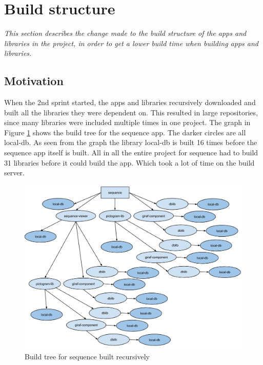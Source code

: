 \section{Build structure}
\label{Sprint2_buildstructure}
\textit{This section describes the change made to the build structure of the apps and libraries in the project, in order to get a lower build time when building apps and libraries.}

\subsection{Motivation}

When the 2nd sprint started, the apps and libraries recursively downloaded and built all the libraries they were dependent on. This resulted in large repositories, since many libraries were included multiple times in one project. The graph in Figure \ref{oldbuild} shows the build tree for the sequence app. The darker circles are all local-db. As seen from the graph the library local-db is built 16 times before the sequence app itself is built. All in all the entire project for sequence had to build 31 libraries before it could build the app. Which took a lot of time on the build server.

\begin{figure}[H]
	\centering
	\includegraphics[width=0.8 \textwidth]{pictures/oldbuild.png}
	\caption{Build tree for sequence built recursively}
	\label{oldbuild}
\end{figure}

